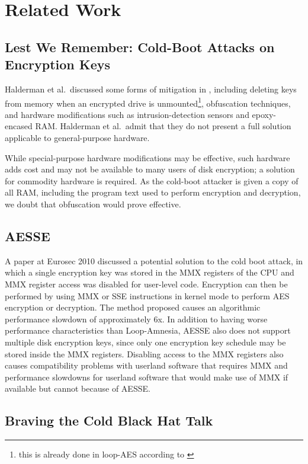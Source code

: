 \documentclass[letterpaper,twocolumn,nonatbib,10pt]{article}
\begin{document}
\section{Related Work}



\subsection{Lest We Remember: Cold-Boot Attacks on Encryption Keys}

Halderman et al.\ discussed some forms of mitigation in
\cite{princetonattack}, including deleting keys from memory when an
encrypted drive is unmounted\footnote{this is already done in loop-AES
  according to \cite{ruusumail}}, obfuscation techniques, and hardware
modifications such as intrusion-detection sensors and epoxy-encased
RAM.  Halderman et al.\ admit that they do not present a full solution
applicable to general-purpose hardware.

While special-purpose hardware modifications may be effective, such
hardware adds cost and may not be available to many users of disk
encryption; a solution for commodity hardware is required.  As the
cold-boot attacker is given a copy of all RAM, including the program
text used to perform encryption and decryption, we doubt that
obfuscation would prove effective.

\subsection{AESSE}

A paper at Eurosec 2010 \cite{aesse} discussed a potential solution to
the cold boot attack, in which a single encryption key was stored in
the MMX registers of the CPU and MMX register access was disabled for
user-level code.  Encryption can then be performed by using MMX or SSE
instructions in kernel mode to perform AES encryption or decryption.
The method proposed causes an algorithmic performance slowdown of
approximately 6x.  In addition to having worse performance
characteristics than Loop-Amnesia, AESSE also does not support
multiple disk encryption keys, since only one encryption key schedule
may be stored inside the MMX registers.  Disabling access to the MMX
registers also causes compatibility problems with userland software
that requires MMX and performance slowdowns for userland software that
would make use of MMX if available but cannot because of AESSE.

\subsection{Braving the Cold Black Hat Talk}
\end{document}
